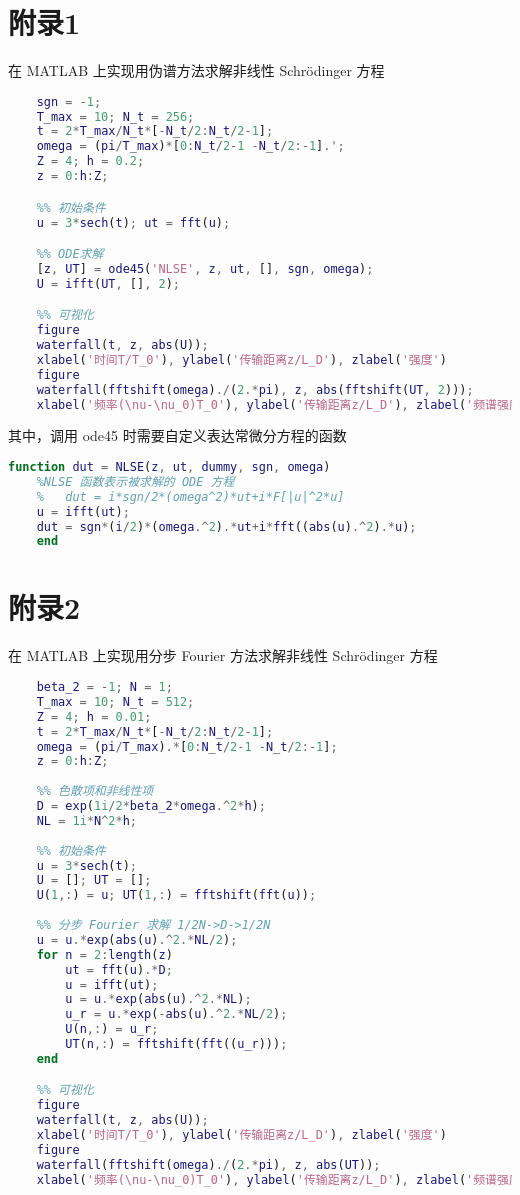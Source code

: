 \section{附录1} %
在 MATLAB 上实现用伪谱方法求解非线性 Schr\"odinger 方程
\begin{lstlisting}[language=Matlab,
  morekeywords={},
  emph={fft, ifft, ode45},
  caption={伪谱方法求解三阶孤子}
  ]
    %% 参数设置
    sgn = -1;
    T_max = 10; N_t = 256; 
    t = 2*T_max/N_t*[-N_t/2:N_t/2-1];
    omega = (pi/T_max)*[0:N_t/2-1 -N_t/2:-1].';
    Z = 4; h = 0.2;
    z = 0:h:Z;

    %% 初始条件
    u = 3*sech(t); ut = fft(u);

    %% ODE求解
    [z, UT] = ode45('NLSE', z, ut, [], sgn, omega);
    U = ifft(UT, [], 2);

    %% 可视化
    figure
    waterfall(t, z, abs(U));
    xlabel('时间T/T_0'), ylabel('传输距离z/L_D'), zlabel('强度')
    figure
    waterfall(fftshift(omega)./(2.*pi), z, abs(fftshift(UT, 2)));
    xlabel('频率(\nu-\nu_0)T_0'), ylabel('传输距离z/L_D'), zlabel('频谱强度')
\end{lstlisting}
其中，调用 ode45 时需要自定义表达常微分方程的函数
\begin{lstlisting}[language=Matlab,
  morekeywords={},
  emph={fft, ifft},
  caption={}
  ]
    function dut = NLSE(z, ut, dummy, sgn, omega)
    %NLSE 函数表示被求解的 ODE 方程
    %   dut = i*sgn/2*(omega^2)*ut+i*F[|u|^2*u]
    u = ifft(ut);
    dut = sgn*(i/2)*(omega.^2).*ut+i*fft((abs(u).^2).*u);
    end
\end{lstlisting}

\newpage
\section{附录2}
在 MATLAB 上实现用分步 Fourier 方法求解非线性 Schr\"odinger 方程
\begin{lstlisting}[language=Matlab,
  morekeywords={},
  emph={fft, ifft, ode45},
  caption={分步 Fourier 方法求解三阶孤子}
  ]
    %% 参数设置
    beta_2 = -1; N = 1;
    T_max = 10; N_t = 512;
    Z = 4; h = 0.01;
    t = 2*T_max/N_t*[-N_t/2:N_t/2-1];
    omega = (pi/T_max).*[0:N_t/2-1 -N_t/2:-1];
    z = 0:h:Z;
    
    %% 色散项和非线性项
    D = exp(1i/2*beta_2*omega.^2*h);
    NL = 1i*N^2*h;
    
    %% 初始条件
    u = 3*sech(t);
    U = []; UT = [];
    U(1,:) = u; UT(1,:) = fftshift(fft(u));
    
    %% 分步 Fourier 求解 1/2N->D->1/2N
    u = u.*exp(abs(u).^2.*NL/2);
    for n = 2:length(z)
        ut = fft(u).*D;
        u = ifft(ut);
        u = u.*exp(abs(u).^2.*NL);
        u_r = u.*exp(-abs(u).^2.*NL/2);
        U(n,:) = u_r;
        UT(n,:) = fftshift(fft((u_r)));
    end

    %% 可视化
    figure
    waterfall(t, z, abs(U));
    xlabel('时间T/T_0'), ylabel('传输距离z/L_D'), zlabel('强度')
    figure
    waterfall(fftshift(omega)./(2.*pi), z, abs(UT));
    xlabel('频率(\nu-\nu_0)T_0'), ylabel('传输距离z/L_D'), zlabel('频谱强度')    
\end{lstlisting}

